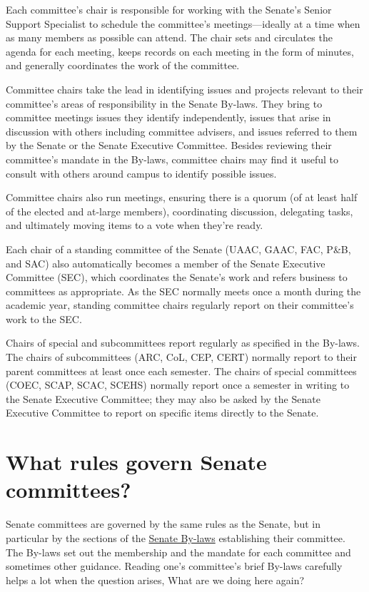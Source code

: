 \documentclass[12pt]{article}
\begin{document}
Each committee's chair is responsible for working with the Senate's
Senior Support Specialist to schedule the committee's meetings---ideally
at a time when as many members as possible can attend. The chair sets
and circulates the agenda for each meeting, keeps records on each
meeting in the form of minutes, and generally coordinates the work of
the committee.

Committee chairs take the lead in identifying issues and projects
relevant to their committee's areas of responsibility in the Senate
By-laws. They bring to committee meetings issues they identify
independently, issues that arise in discussion with others including
committee advisers, and issues referred to them by the Senate or the
Senate Executive Committee. Besides reviewing their committee's mandate
in the By-laws, committee chairs may find it useful to consult with
others around campus to identify possible issues.

Committee chairs also run meetings, ensuring there is a quorum (of at
least half of the elected and at-large members), coordinating
discussion, delegating tasks, and ultimately moving items to a vote when
they're ready.

Each chair of a standing committee of the Senate (UAAC, GAAC, FAC, P\&B,
and SAC) also automatically becomes a member of the Senate Executive
Committee (SEC), which coordinates the Senate's work and refers business
to committees as appropriate. As the SEC normally meets once a month
during the academic year, standing committee chairs regularly report on
their committee's work to the SEC.

Chairs of special and subcommittees report regularly as specified in the
By-laws. The chairs of subcommittees (ARC, CoL, CEP, CERT) normally
report to their parent committees at least once each semester. The
chairs of special committees (COEC, SCAP, SCAC, SCEHS) normally report
once a semester in writing to the Senate Executive Committee; they may
also be asked by the Senate Executive Committee to report on specific
items directly to the Senate.

\section{What rules govern Senate
committees?}\label{what-rules-govern-senate-committees}

Senate committees are governed by the same rules as the Senate, but in
particular by the sections of the
\href{https://www.hofstra.edu/sites/default/files/2022-04/senatebylaws.pdf}{Senate
By-laws} establishing their committee. The By-laws set out the
membership and the mandate for each committee and sometimes other
guidance. Reading one's committee's brief By-laws carefully helps a lot
when the question arises, What are we doing here again?
\end{document}
